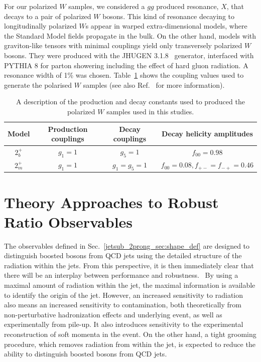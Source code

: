 \documentclass[11pt]{cernrep}
\begin{document}
For our polarized $W$ samples, we considered a $gg$ produced resonance, $X$, that decays to a pair of polarized $W$ bosons.
%
This kind of resonance decaying to longitudinally polarized $W$s appear in warped extra-dimensional models, where the Standard Model fields propagate in the bulk.
%
On the other hand, models with graviton-like tensors with minimal couplings yield only transversely polarized $W$ bosons.
%
They were produced with the \textsc{JHUGEN} 3.1.8~\cite{Gao:2010qx,Bolognesi:2012mm} generator, interfaced with \textsc{PYTHIA} 8 \cite{Sjostrand:2007gs} for parton showering including the effect of hard gluon radiation.
A resonance width of 1\% was chosen.
%
Table~\ref{jetsub_2prong_table:polarisedSamples} shows the coupling values used to generate the polarised $W$ samples (see also Ref.~\cite{Gao:2010qx} for more information). 

\begin{table}[t]
\centering
\begin{tabular}{|c|c|c|c|}
\hline
Model	&Production couplings	&Decay couplings	&Decay helicity amplitudes 	\\
\hline
$2_b^+$	& $g_1=1$		& $g_5=1$		& $f_{00}=0.98$			\\
$2_m^+$	& $g_1=1$		& $g_1=g_5=1$		& $f_{00}=0.08,f_{+-}=f_{-+}=0.46$\\	
\hline
\end{tabular}
\caption{A description of the production and decay constants used to produced the polarized $W$ samples used in this studies.}
\label{jetsub_2prong_table:polarisedSamples}
\end{table}



\section{Theory Approaches to Robust Ratio Observables}\label{jetsub_2prong_sec:hybrid_ratio}

The observables defined in Sec.~\ref{jetsub_2prong_sec:shape_def} are designed to
distinguish boosted bosons from QCD jets using the detailed structure
of the radiation within the jets.
%
From this perspective, it is then
immediately clear that there will be an interplay between performance
and robustness.\
%
By using a maximal amount of radiation within the jet,
the maximal information is available to identify the origin of the
jet.
%
However, an increased sensitivity to radiation also means an
increased sensitivity to contamination, both theoretically from
non-perturbative hadronization effects and underlying event, as well
as experimentally from pile-up.
%
It also introduces sensitivity to the
experimental reconstruction of soft momenta in the event.
%
On the other
hand, a tight grooming procedure, which removes radiation from within
the jet, is expected to reduce the ability to distinguish boosted
bosons from QCD jets.
\end{document}
